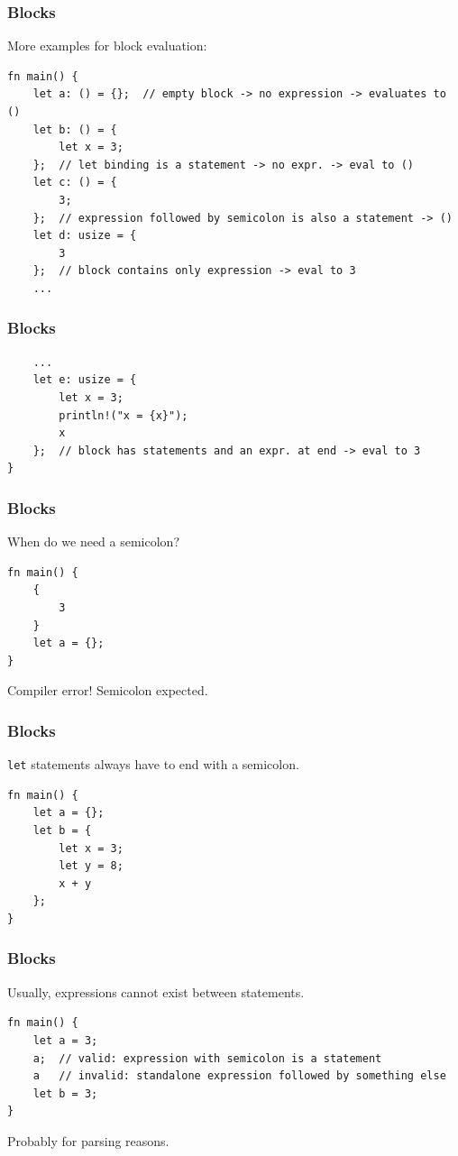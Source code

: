 \begin{frame}[fragile]
    \frametitle{Blocks}
    More examples for block evaluation:
    \begin{verbatim}
fn main() {
    let a: () = {};  // empty block -> no expression -> evaluates to ()
    let b: () = {
        let x = 3;
    };  // let binding is a statement -> no expr. -> eval to ()
    let c: () = {
        3;
    };  // expression followed by semicolon is also a statement -> ()
    let d: usize = {
        3
    };  // block contains only expression -> eval to 3
    ...
    \end{verbatim}
\end{frame}

\begin{frame}[fragile]
    \frametitle{Blocks}
    \begin{verbatim}
    ...
    let e: usize = {
        let x = 3;
        println!("x = {x}");
        x
    };  // block has statements and an expr. at end -> eval to 3
}
    \end{verbatim}
\end{frame}

\begin{frame}[fragile]
    \frametitle{Blocks}
    When do we need a semicolon?
    \pause
    \vfill
    \begin{verbatim}
fn main() {
    {
        3
    }
    let a = {};
}
    \end{verbatim}
    \pause
    \vfill
    Compiler error! Semicolon expected.
\end{frame}

\begin{frame}[fragile]
    \frametitle{Blocks}
    \texttt{let} statements always have to end with a semicolon.
    \begin{verbatim}
fn main() {
    let a = {};
    let b = {
        let x = 3;
        let y = 8;
        x + y
    };
}
    \end{verbatim}
\end{frame}

\begin{frame}[fragile]
    \frametitle{Blocks}
    Usually, expressions cannot exist between statements.
    \pause
    \vfill
    \begin{verbatim}
fn main() {
    let a = 3;
    a;  // valid: expression with semicolon is a statement
    a   // invalid: standalone expression followed by something else
    let b = 3;
}
    \end{verbatim}
    \pause
    \vfill
    Probably for parsing reasons.
\end{frame}

